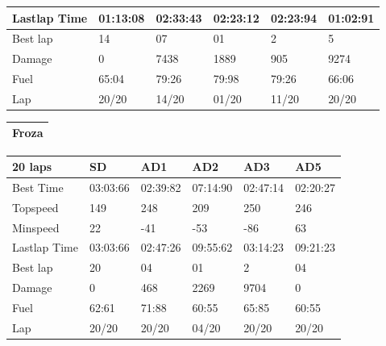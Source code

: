 \documentclass{llncs}
\begin{document}
\begin{table} [h!]
\begin{tabular}{ |p{3cm}|p{2cm}|p{2cm}|p{2 cm}|p{2 cm}|p{2 cm}|}
		
		Lastlap	Time  & 01:13:08  & 02:33:43 & 02:23:12 & 02:23:94& 01:02:91 
		\\
		\hline 
		Best lap & 14 & 07 & 01 & 2 & 5 
		\\
		\hline
		Damage &  0 & 7438 & 1889 & 905 & 9274 
		\\
		\hline 
		Fuel & 65:04 & 79:26 & 79:98 & 79:26  & 66:06 
		\\
		\hline
		Lap & 20/20 & 14/20 & 01/20 & 11/20 & 20/20
		\\
		\hline
	\end{tabular}
	
	\begin{tabular}{ |p{15.2cm}|}
		\hline
		\textbf{Froza}   
		\\
		\hline
	\end{tabular}
	\begin{tabular}{ |p{3cm}|p{2cm}|p{2cm}|p{2 cm}|p{2 cm}|p{2 cm}|}
		\hline
		{ \color{blue}\textbf{20 laps} }&
		{ \color{red}\textbf{SD}}&  
		{ \color{red} \textbf{AD1} } &
		{ \color{red} \textbf{AD2} } &
		{ \color{red} \textbf{AD3} } &
		{ \color{red} \textbf{AD5} }
		\\
		\hline
		Best Time & 03:03:66  & 02:39:82 & 07:14:90  & 02:47:14  & 02:20:27 
		\\
		\hline
		Topspeed & 149 & 248 & 209 & 250 & 246 
		\\
		\hline
		Minspeed & 22  & -41 & -53 & -86 & 63 
		\\
		\hline 
		
		
		Lastlap	Time  & 03:03:66 & 02:47:26 & 09:55:62 & 03:14:23 & 09:21:23
		\\
		\hline 
		Best lap & 20 & 04 & 01 & 2 & 04 
		\\
		\hline
		Damage & 0 & 468 & 2269 & 9704 & 0 
		\\
		\hline 
		Fuel & 62:61 & 71:88 & 60:55 & 65:85 & 60:55
		\\
		\hline 
		Lap & 20/20 & 20/20 & 04/20 & 20/20 & 20/20
		\\
		\hline
	\end{tabular}
\end{table}
\newpage
\end{document}
